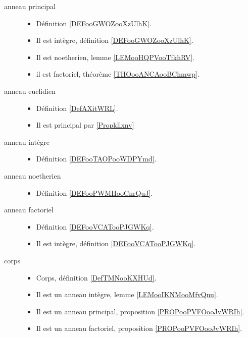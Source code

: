 \begin{description}
	\item[anneau principal]\hspace{1cm}
	\begin{itemize}
		\item
		      Définition \ref{DEFooGWOZooXzUlhK}.
		\item
		      Il est intègre, définition \ref{DEFooGWOZooXzUlhK}.
		\item
		      Il est noetherien, lemme \ref{LEMooHQPVooTfkhRV}.
		\item
		      il est factoriel, théorème \ref{THOooANCAooBChmwp}.
	\end{itemize}
	\item[anneau euclidien]\hspace{1cm}
	\begin{itemize}
		\item
		      Définition \ref{DefAXitWRL}.
		\item
		      Il est principal par \ref{Propkllxnv}
	\end{itemize}
	\item[anneau intègre]\hspace{1cm}
	\begin{itemize}
		\item
		      Définition \ref{DEFooTAOPooWDPYmd}.
	\end{itemize}
	\item[anneau noetherien]\hspace{1cm}
	\begin{itemize}
		\item
		      Définition \ref{DEFooPWMHooCnrQuJ}.
	\end{itemize}
	\item[anneau factoriel]\hspace{1cm}
	\begin{itemize}
		\item
		      Définition \ref{DEFooVCATooPJGWKq}.
		\item
		      Il est intègre, définition \ref{DEFooVCATooPJGWKq}.
	\end{itemize}
	\item[corps]\hspace{1cm}
	\begin{itemize}
		\item
		      Corps, définition \ref{DefTMNooKXHUd}.
		\item
		      Il est un anneau intègre, lemme \ref{LEMooIKNMooMfvQnu}.
		\item
		      Il est un anneau principal, proposition \ref{PROPooPVFOooJvWRIh}.
		\item
		      Il est un anneau factoriel, proposition \ref{PROPooPVFOooJvWRIh}.
	\end{itemize}
\end{description}


